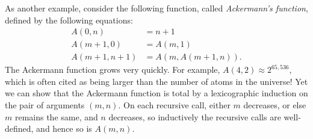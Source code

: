 \smallskip

As another example, consider the following function, called \emph{Ackermann's
  function}, defined by the following equations:
\begin{align*}
A(0,n)     &= n+1 \\
A(m+1,0)   &= A(m,1) \\
A(m+1,n+1) &= A(m, A(m+1,n)).
\end{align*}
The Ackermann function grows very quickly.  For example, $A(4,2) \approx 2^{65,536}$,
which is often cited as being larger than the number of atoms in the
universe!  Yet we can show that the Ackermann function is total by a
lexicographic induction on the pair of arguments $(m,n)$.  On each recursive
call, either $m$ decreases, or else $m$ remains the same, and $n$ decreases, so
inductively the recursive calls are well-defined, and hence so is $A(m,n)$.


